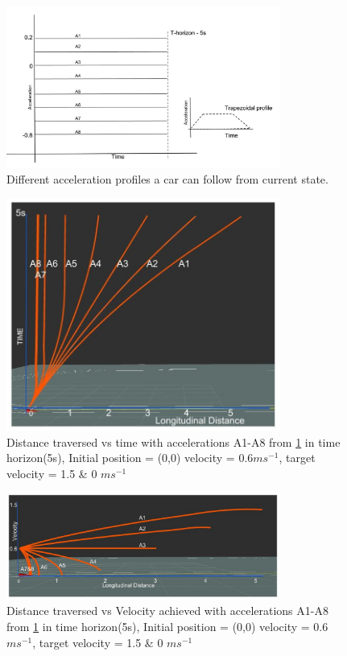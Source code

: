  \begin{figure}
    \centering
    \includegraphics[width=0.8\textwidth]{Images/accelerations2.jpg}
    \caption{Different acceleration profiles a car can follow from current state.}
    \label{accelerations}
\end{figure}

 \begin{figure}
    \centering
    \includegraphics[width=0.8\textwidth]{Images/concept/distvstime2.jpg}
    \caption{Distance traversed vs time with accelerations A1-A8 from \ref{accelerations} in time horizon(5s), Initial position = (0,0) velocity = 0.6$ms^{-1}$, target velocity = 1.5 \& 0 $ms^{-1}$}
    \label{distances}
\end{figure}

 \begin{figure}
	\centering
	\includegraphics[width=0.8\textwidth]{Images/concept/distvsvel2.jpg}
	\caption{Distance traversed vs Velocity achieved with accelerations A1-A8 from \ref{accelerations} in time horizon(5s), Initial position = (0,0) velocity = 0.6$ms^{-1}$, target velocity = 1.5 \& 0 $ms^{-1}$}
	\label{velocities}
\end{figure}


